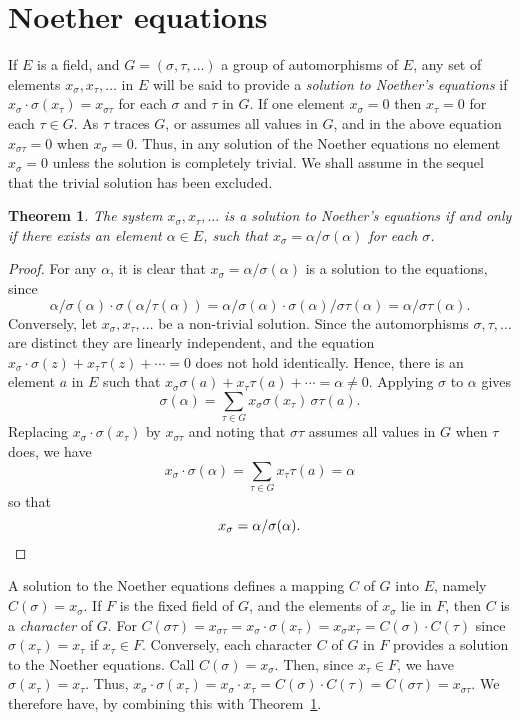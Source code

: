 \documentclass[10pt,leqno,a5paper]{book}
\newtheorem{theo}{Theorem}
\theoremstyle{definition}
\let\htw\section
\begin{document}
\htw{Noether equations}

If $E$ is a field, and $G = (\sigma, \tau, \ldots)$ a group of automorphisms of $E$, any set of elements $x_\sigma, x_\tau, \ldots$ in $E$ will be said to provide a \emph{solution to Noether's equations} if $x_\sigma \cdot \sigma(x_\tau) = x_{\sigma\tau}$ for each $\sigma$ and $\tau$ in $G$.
If one element $x_\sigma = 0$ then $x_\tau = 0$ for each $\tau \in G$.
As $\tau$ traces $G$, or assumes all values in $G$, and in the above equation $x_{\sigma\tau} = 0$ when $x_\sigma = 0$.
Thus, in any solution of the Noether equations no element $x_\sigma = 0$ unless the solution is completely trivial.
We shall assume in the sequel that the trivial solution has been excluded.


\begin{theo}
\label{theo:21}
The system $x_\sigma, x_\tau, \ldots$ is a solution to Noether's equations if and only if there exists an element $\alpha \in E$, such that $x_\sigma = \alpha / \sigma(\alpha)$ for each $\sigma$.
\end{theo}


\begin{proof}
For any $\alpha$, it is clear that $x_\sigma = \alpha / \sigma(\alpha)$ is a solution to the equations, since
\[
\alpha / \sigma(\alpha) \cdot \sigma(\alpha / \tau(\alpha))
= \alpha / \sigma(\alpha) \cdot \sigma(\alpha) / \sigma\tau(\alpha)
= \alpha / \sigma\tau(\alpha).
\]
Conversely, let $x_\sigma, x_\tau, \ldots$ be a non-trivial solution.
Since the automorphisms $\sigma, \tau, \ldots$ are distinct they are linearly independent, and the equation $x_\sigma \cdot \sigma(z) + x_\tau\tau(z) + \cdots = 0$ does not hold identically.
Hence, there is an element $a$ in $E$ such that $x_\sigma \sigma(a) + x_\tau \tau(a) + \cdots = \alpha \not= 0$.
Applying $\sigma$ to $\alpha$ gives
\[
\sigma(\alpha)
= \sum_{\tau \in G} x_\sigma \sigma(x_\tau) \, \sigma\tau(a).
\]
Replacing $x_\sigma \cdot \sigma(x_\tau)$ by $x_{\sigma\tau}$ and noting that $\sigma\tau$ assumes all values in $G$ when $\tau$ does, we have
\[
x_\sigma \cdot \sigma(\alpha)
= \sum_{\tau \in G} x_{\tau} \tau(a)
= \alpha
\]
so that
\[
x_\sigma = \alpha / \sigma(\alpha).
\qedhere
\]
\end{proof}


A solution to the Noether equations defines a mapping $C$ of $G$ into $E$, namely $C(\sigma) = x_\sigma$.
If $F$ is the fixed field of $G$, and the elements of $x_\sigma$ lie in $F$, then $C$ is a \emph{character} of $G$.
For $C(\sigma\tau) = x_{\sigma\tau} = x_\sigma \cdot \sigma(x_\tau) = x_\sigma x_\tau = C(\sigma) \cdot C(\tau)$ since $\sigma(x_\tau) = x_\tau$ if $x_\tau \in F$.
Conversely, each character $C$ of $G$ in $F$ provides a solution to the Noether equations.
Call $C(\sigma) = x_\sigma$.
Then, since $x_\tau \in F$, we have $\sigma(x_\tau) = x_\tau$.
Thus, $x_\sigma \cdot \sigma(x_\tau) = x_\sigma \cdot x_\tau = C(\sigma) \cdot C(\tau) = C(\sigma\tau) = x_{\sigma\tau}$.
We therefore have, by combining this with Theorem~\ref{theo:21}.
\end{document}
